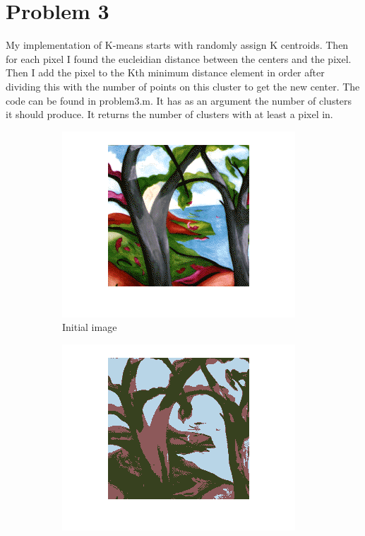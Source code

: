 \section*{Problem 3}
My implementation of K-means starts with randomly assign K centroids.
Then for each pixel I found the eucleidian distance between the centers
and the pixel. Then I add the pixel to the Kth minimum distance element
in order after dividing this with the number of points on this cluster to
get the new center. The code can be found in problem3.m. It has as an
argument the number of clusters it should produce. It returns the number
of clusters with at least a pixel in.
\begin{figure}[ht] 
  \begin{subfigure}[b]{0.5\linewidth}
    \centering
    \includegraphics[width=0.75\linewidth]{figures/initial.png}
    \caption{Initial image} 
    \vspace{4ex}
  \end{subfigure}%
  \begin{subfigure}[b]{0.5\linewidth}
    \centering
    \includegraphics[width=0.75\linewidth]{figures/kmeans3.png} 

\end{subfigure}
\end{figure}
